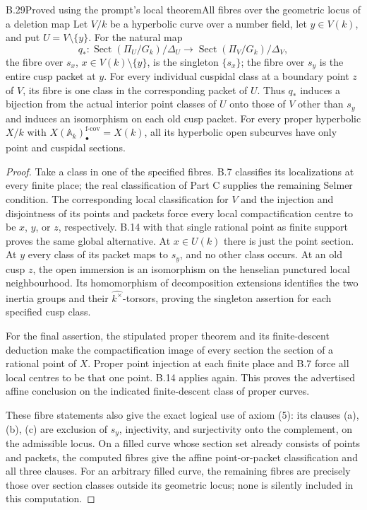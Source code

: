 \begin{statement}{B.29}{Proved using the prompt's local theorem}{All fibres over the geometric locus of a deletion map}
Let $V/k$ be a hyperbolic curve over a number field, let $y\in V(k)$,
and put $U=V\setminus\{y\}$.  For the natural map
\[
 q_*:\operatorname{Sect}(\Pi_U/G_k)/\Delta_U
       \longrightarrow\operatorname{Sect}(\Pi_V/G_k)/\Delta_V,
\]
the fibre over $s_x$, $x\in V(k)\setminus\{y\}$, is the singleton
$\{s_x\}$; the fibre over $s_y$ is the entire cusp packet at $y$.
For every individual cuspidal class at a boundary point $z$ of $V$,
its fibre is one class in the corresponding packet of $U$.
Thus $q_*$ induces a bijection from the actual interior point
classes of $U$ onto those of $V$ other than $s_y$ and induces an
isomorphism on each old cusp packet.
For every proper hyperbolic $X/k$ with
$X(\mathbb A_k)_\bullet^{\mathrm{f\text{-}cov}}=X(k)$, all its
hyperbolic open subcurves have only point and cuspidal sections.
\end{statement}
\begin{proof}
Take a class in one of the specified fibres.  B.7 classifies its
localizations at every finite place; the real classification of
Part C supplies the remaining Selmer condition.  The corresponding local
classification for $V$ and the injection and disjointness of its
points and packets force every local compactification centre to
be $x$, $y$, or $z$, respectively.  B.14 with that single rational
point as finite support proves the same global alternative.
At $x\in U(k)$ there is just the point section.  At $y$ every
class of its packet maps to $s_y$, and no other class occurs.
At an old cusp $z$, the open immersion is an isomorphism on the
henselian punctured local neighbourhood.  Its homomorphism of
decomposition extensions identifies the two inertia groups and
their $\widehat{k^\times}$-torsors, proving the singleton assertion
for each specified cusp class.

For the final assertion, the stipulated proper theorem and its
finite-descent deduction make the compactification image of every
section the section of a rational point of $X$.  Proper point
injection at each finite place and B.7 force all local centres to
be that one point.  B.14 applies again.  This proves the advertised
affine conclusion on the indicated finite-descent class of proper
curves.

These fibre statements also give the exact logical use of axiom
(5): its clauses (a), (b), (c) are exclusion of $s_y$, injectivity,
and surjectivity onto the complement, on the admissible locus.
On a filled curve whose section set already consists of points
and packets, the computed fibres give the affine point-or-packet
classification and all three clauses.  For an arbitrary filled
curve, the remaining fibres are precisely those over section
classes outside its geometric locus; none is silently included
in this computation.
\end{proof}

